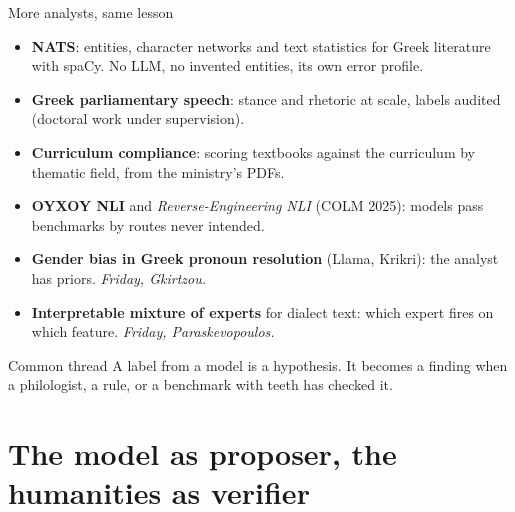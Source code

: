 \documentclass[aspectratio=169, 10pt]{beamer}
\newcommand{\key}[1]{\textcolor{aegean}{\textbf{#1}}}
\begin{document}
\begin{frame}{More analysts, same lesson}
  \small
  \setlength{\parskip}{2pt}
  \begin{itemize}
    \item \key{NATS}: entities, character networks and text statistics for Greek literature with spaCy. No LLM, no invented entities, its own error profile.
    \item \key{Greek parliamentary speech}: stance and rhetoric at scale, labels audited (doctoral work under supervision).
    \item \key{Curriculum compliance}: scoring textbooks against the curriculum by thematic field, from the ministry's PDFs.
    \item \key{OYXOY NLI} and \emph{Reverse-Engineering NLI} (COLM 2025): models pass benchmarks by routes never intended.
    \item \key{Gender bias in Greek pronoun resolution} (Llama, Krikri): the analyst has priors. \textit{Friday, Gkirtzou.}
    \item \key{Interpretable mixture of experts} for dialect text: which expert fires on which feature. \textit{Friday, Paraskevopoulos.}
  \end{itemize}
  \begin{block}{Common thread}
    A label from a model is a hypothesis. It becomes a finding when a philologist, a rule, or a benchmark with teeth has checked it.
  \end{block}
\end{frame}

\section{The model as proposer, the humanities as verifier}
\end{document}
